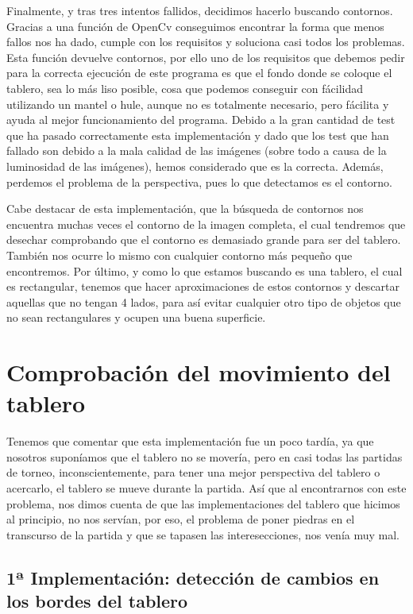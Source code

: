 \documentclass[12pt,a4papert,woside,openright,titlepage,final]{book}
\begin{document}
Finalmente, y tras tres intentos fallidos, decidimos hacerlo buscando contornos.
Gracias a una función de OpenCv conseguimos encontrar la forma que menos fallos
nos ha dado, cumple con los requisitos y soluciona casi todos los problemas.
Esta función devuelve contornos, por ello uno de los requisitos que debemos
pedir para la correcta ejecución de este programa es que el fondo donde se
coloque el tablero, sea lo más liso posible, cosa que podemos conseguir con
fácilidad utilizando un mantel o hule, aunque no es totalmente necesario, pero
fácilita y ayuda al mejor funcionamiento del programa. Debido a la gran cantidad
de test que ha pasado correctamente esta implementación y dado que los test que
han fallado son debido a la mala calidad de las imágenes (sobre todo a causa de
la luminosidad de las imágenes), hemos considerado que es la correcta. Además,
perdemos el problema de la perspectiva, pues lo que detectamos es el contorno.

Cabe destacar de esta implementación, que la búsqueda de contornos nos encuentra
muchas veces el contorno de la imagen completa, el cual tendremos que desechar
comprobando que el contorno es demasiado grande para ser del tablero. También
nos ocurre lo mismo con cualquier contorno más pequeño que encontremos. Por
último, y como lo que estamos buscando es una tablero, el cual es rectangular,
tenemos que hacer aproximaciones de estos contornos y descartar aquellas que no
tengan 4 lados, para así evitar cualquier otro tipo de objetos que no sean
rectangulares y ocupen una buena superficie. 




\section{Comprobación del movimiento del tablero}

Tenemos que comentar que esta implementación fue un poco tardía, ya que nosotros
suponíamos que el tablero no se movería, pero en casi todas las partidas de
torneo, inconscientemente, para tener una mejor perspectiva del tablero o
acercarlo, el tablero se mueve durante la partida. Así que al encontrarnos con
este problema, nos dimos cuenta de que las implementaciones del tablero que
hicimos al principio, no nos servían, por eso, el problema de poner piedras en
el transcurso de la partida y que se tapasen las interesecciones, nos venía muy
mal. 

\subsection{1ª Implementación: detección de cambios en los bordes del tablero}
\end{document}
